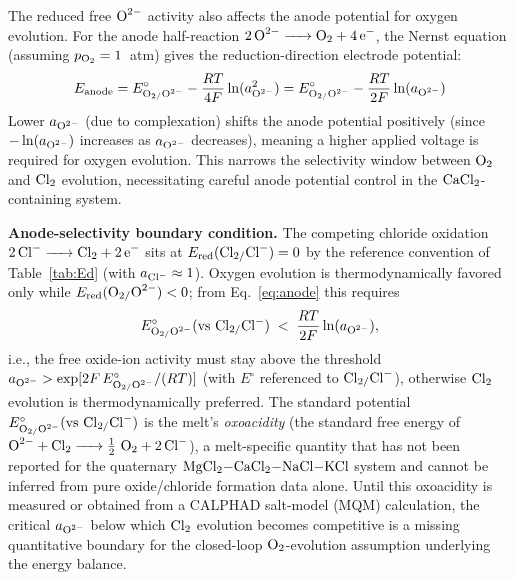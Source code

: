 \documentclass[11pt]{article}
\begin{document}
The reduced free $\ce{O^{2-}}$ activity also affects the anode potential for oxygen evolution. For the anode half-reaction $\ce{2O^{2-} -> O2 + 4e^-}$, the Nernst equation (assuming $p_{\ce{O2}} = 1$~atm) gives the reduction-direction electrode potential:
\begin{equation}
\label{eq:anode}
E_{\mathrm{anode}} = E^{\circ}_{\ce{O2/O^{2-}}} - \frac{RT}{4F}\ln(a_{\ce{O^{2-}}}^2) = E^{\circ}_{\ce{O2/O^{2-}}} - \frac{RT}{2F}\ln(a_{\ce{O^{2-}}})
\end{equation}
Lower $a_{\ce{O^{2-}}}$ (due to complexation) shifts the anode potential positively (since $-\ln(a_{\ce{O^{2-}}})$ increases as $a_{\ce{O^{2-}}}$ decreases), meaning a higher applied voltage is required for oxygen evolution. This narrows the selectivity window between $\ce{O2}$ and $\ce{Cl2}$ evolution, necessitating careful anode potential control in the $\ce{CaCl2}$-containing system.

\textbf{Anode-selectivity boundary condition.} The competing chloride oxidation $\ce{2Cl^- -> Cl2 + 2e^-}$ sits at $E_{\mathrm{red}}(\ce{Cl2/Cl^-}) = 0$ by the reference convention of Table~\ref{tab:Ed} (with $a_{\ce{Cl^-}} \approx 1$). Oxygen evolution is thermodynamically favored only while $E_{\mathrm{red}}(\ce{O2/O^{2-}}) < 0$; from Eq.~\ref{eq:anode} this requires
\begin{equation}
E^{\circ}_{\ce{O2/O^{2-}}}(\mathrm{vs}~\ce{Cl2/Cl^-}) \;<\; \frac{RT}{2F}\ln(a_{\ce{O^{2-}}}),
\end{equation}
i.e., the free oxide-ion activity must stay above the threshold $a_{\ce{O^{2-}}} > \exp[2F\,E^{\circ}_{\ce{O2/O^{2-}}}/(RT)]$ (with $E^{\circ}$ referenced to $\ce{Cl2/Cl^-}$), otherwise $\ce{Cl2}$ evolution is thermodynamically preferred. The standard potential $E^{\circ}_{\ce{O2/O^{2-}}}(\mathrm{vs}~\ce{Cl2/Cl^-})$ is the melt's \emph{oxoacidity} (the standard free energy of $\ce{O^{2-} + Cl2 -> 1/2\,O2 + 2Cl^-}$), a melt-specific quantity that has not been reported for the quaternary $\ce{MgCl2-CaCl2-NaCl-KCl}$ system and cannot be inferred from pure oxide/chloride formation data alone. Until this oxoacidity is measured or obtained from a CALPHAD salt-model (MQM) calculation, the critical $a_{\ce{O^{2-}}}$ below which $\ce{Cl2}$ evolution becomes competitive is a missing quantitative boundary for the closed-loop $\ce{O2}$-evolution assumption underlying the energy balance.
\end{document}
